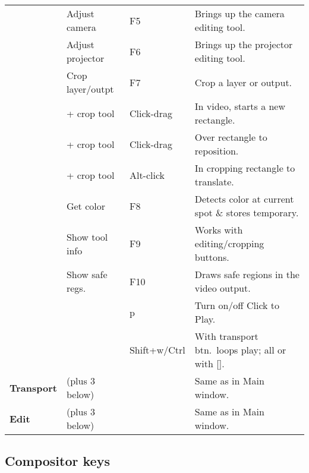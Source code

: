 \begin{longtable}[h]{>{\bfseries}p{}p{}p{}p{}}
  & Adjust camera & F5 & Brings up the camera editing tool. \\
  & Adjust projector & F6 & Brings up the projector editing tool. \\
  & Crop layer/outpt & F7 & Crop a layer or output. \\
  & + crop tool & Click-drag & In video, starts a new rectangle. \\
  &  + crop tool & Click-drag & Over rectangle to reposition. \\
  &  + crop tool & Alt-click & In cropping rectangle to translate. \\
  & Get color & F8 & Detects color at current spot \& stores temporary. \\
  & Show tool info & F9 & Works with editing/cropping buttons. \\
  & Show safe regs. & F10 & Draws safe regions in the video output. \\
  &  & p & Turn on/off Click to Play. \\
  &  & Shift+w/Ctrl & With transport btn.\ loops play; all or with [\;]. \\
  \midrule
  \textcolor{CinBlueText}{Transport} & (plus 3 below) &  & Same as in Main window. \\
  \midrule
  \textcolor{CinBlueText}{Edit} & (plus 3 below) &  & Same as in Main window. \\
  \bottomrule
\end{longtable}


\subsection*{Compositor keys }%
\label{ssec:compositor_keys}

